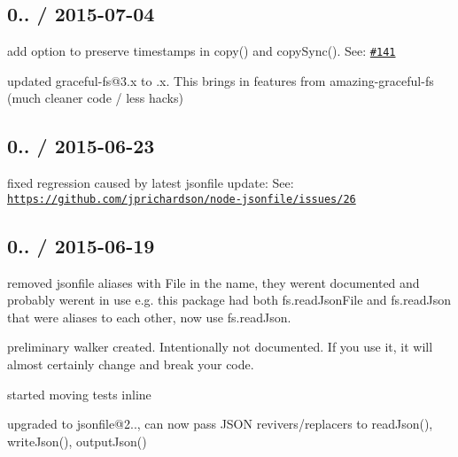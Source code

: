 \subsection*{0.. / 2015-\/07-\/04 }


\begin{DoxyItemize}
\item add option to preserve timestamps in {\ttfamily copy()} and {\ttfamily copy\+Sync()}. See\+: \href{https://github.com/jprichardson/node-fs-extra/pull/141}{\tt \#141}
\item updated {\ttfamily graceful-\/fs@3.\+x} to {.\+x}. This brings in features from {\ttfamily amazing-\/graceful-\/fs} (much cleaner code / less hacks)
\end{DoxyItemize}

\subsection*{0.. / 2015-\/06-\/23 }


\begin{DoxyItemize}
\item fixed regression caused by latest jsonfile update\+: See\+: \href{https://github.com/jprichardson/node-jsonfile/issues/26}{\tt https\+://github.\+com/jprichardson/node-\/jsonfile/issues/26}
\end{DoxyItemize}

\subsection*{0.. / 2015-\/06-\/19 }


\begin{DoxyItemize}
\item removed {\ttfamily jsonfile} aliases with {\ttfamily File} in the name, they weren\textquotesingle{}t documented and probably weren\textquotesingle{}t in use e.\+g. this package had both {\ttfamily fs.\+read\+Json\+File} and {\ttfamily fs.\+read\+Json} that were aliases to each other, now use {\ttfamily fs.\+read\+Json}.
\item preliminary walker created. Intentionally not documented. If you use it, it will almost certainly change and break your code.
\item started moving tests inline
\item upgraded to {\ttfamily jsonfile@2..}, can now pass J\+S\+ON revivers/replacers to {\ttfamily read\+Json()}, {\ttfamily write\+Json()}, {\ttfamily output\+Json()}
\end{DoxyItemize}

